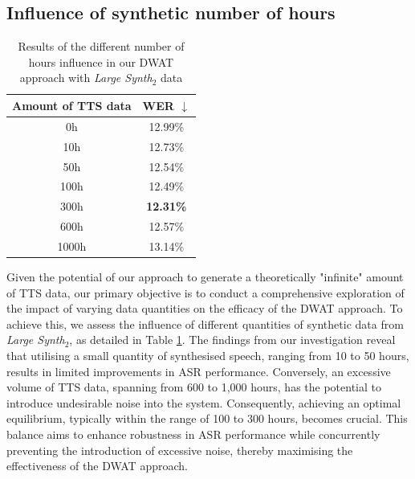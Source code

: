 \subsection{Influence of synthetic number of hours}
\begin{table}[t]
\centering
\begin{tabular}{cc}
\hline
 Amount of TTS data & WER $\downarrow$   \\ \hline
\multicolumn{1}{c}{0h} & 12.99\% \\ \hline
\multicolumn{1}{c}{10h}  &   12.73\%   \\ 
\multicolumn{1}{c}{50h}    & 12.54\%   \\ 
\multicolumn{1}{c}{100h} & 12.49\%  \\ 
\multicolumn{1}{c}{300h} & \textbf{12.31\%}  \\ 
\multicolumn{1}{c}{600h} & 12.57\%  \\ 
\multicolumn{1}{c}{1000h} & 13.14\%  \\ \hline

\end{tabular}

\caption{Results of the different number of hours influence in our DWAT approach with \textit{Large Synth$_2$} data}
\label{tab:hours}
\end{table}

Given the potential of our approach to generate a theoretically "infinite" amount of \ac{TTS} data, our primary objective is to conduct a comprehensive exploration of the impact of varying data quantities on the efficacy of the \ac{DWAT} approach. To achieve this, we assess the influence of different quantities of synthetic data from \textit{Large Synth$_2$}, as detailed in Table \ref{tab:hours}.
The findings from our investigation reveal that utilising a small quantity of synthesised speech, ranging from 10 to 50 hours, results in limited improvements in \ac{ASR} performance. Conversely, an excessive volume of \ac{TTS} data, spanning from 600 to 1,000 hours, has the potential to introduce undesirable noise into the system. Consequently, achieving an optimal equilibrium, typically within the range of 100 to 300 hours, becomes crucial. This balance aims to enhance robustness in \ac{ASR} performance while concurrently preventing the introduction of excessive noise, thereby maximising the effectiveness of the \ac{DWAT} approach.

